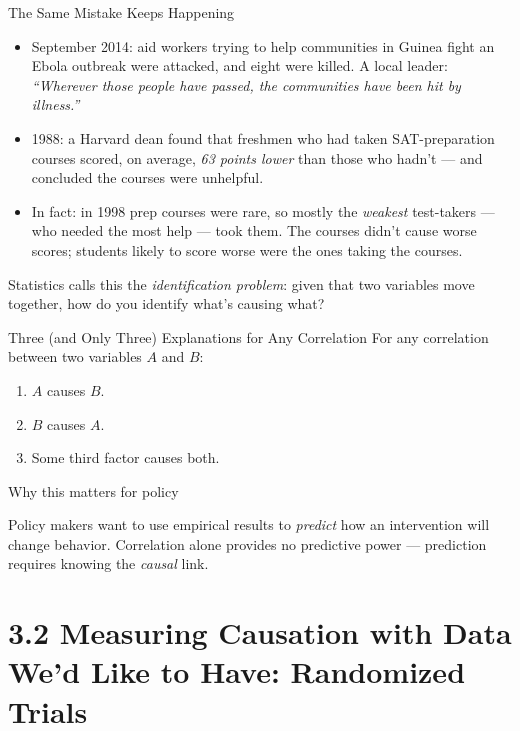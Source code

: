 \documentclass[11pt,aspectratio=169]{beamer}
\begin{document}
\begin{frame}{The Same Mistake Keeps Happening}
  \begin{itemize}
    \item September 2014: aid workers trying to help communities in Guinea fight an Ebola outbreak were attacked, and eight were killed. A local leader: \emph{``Wherever those people have passed, the communities have been hit by illness.''}
    \item 1988: a Harvard dean found that freshmen who had taken SAT-preparation courses scored, on average, \emph{63 points lower} than those who hadn't --- and concluded the courses were unhelpful.
    \item In fact: in 1998 prep courses were rare, so mostly the \emph{weakest} test-takers --- who needed the most help --- took them. The courses didn't cause worse scores; students likely to score worse were the ones taking the courses.
  \end{itemize}
  \vspace{0.3em}
 
  \alert{Statistics calls this the \emph{identification problem}: given that two variables move together, how do you identify what's causing what?}\\
 
\end{frame}

\begin{frame}{Three (and Only Three) Explanations for Any Correlation}
  For any correlation between two variables $A$ and $B$:
  \begin{enumerate}
    \item \(A\) causes \(B\).
    \item \(B\) causes \(A\).
    \item Some third factor causes both.
  \end{enumerate}
  \vspace{0.5em}
  \begin{alertblock}{Why this matters for policy}
    
  \end{alertblock}
  Policy makers want to use empirical results to \emph{predict} how an intervention will change behavior. Correlation alone provides no predictive power --- prediction requires knowing the \emph{causal} link.
\end{frame}

\section{3.2 Measuring Causation with Data We'd Like to Have: Randomized Trials}
\end{document}
